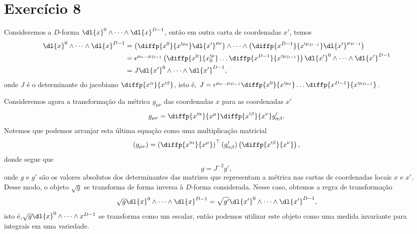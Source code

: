 \section*{Exercício 8}
Consideremos a \(D\)-forma \(\dl{x}^0 \wedge \dots \wedge \dl{x}^{D-1}\), então em outra carta de coordenadas \(x'\), temos
\begin{align*}
    \dl{x}^0 \wedge \dots \wedge \dl{x}^{D-1} &= \left(\diffp{x^0}{x'^{\mu_0}} \dl{x'}^{\mu_0}\right) \wedge \dots \wedge \left(\diffp{x^{D-1}}{x'^{\mu_{D-1}}}\dl{x'}^{\mu_{D-1}}\right)\\
                                              &= \epsilon^{\mu_0\dots\mu_{D-1}} \left(\diffp{x^0}{x'^\mu_0}\dots\diffp{x^{D-1}}{x'^{\mu_{D-1}}}\right) \dl{x'}^0\wedge\dots \wedge\dl{x'}^{D-1}\\
                                              &= J \dl{x'}^0\wedge\dots \wedge\dl{x'}^{D-1},
\end{align*}
onde \(J\) é o determinante do jacobiano \(\diffp{x^\alpha}{x'^\beta}\), isto é, \(J = \epsilon^{\mu_0\dots\mu_{D-1}}\diffp{x^0}{x'^{\mu_0}} \dots \diffp{x^{D-1}}{x'^{\mu_{D-1}}}\).

Consideremos agora a transformação da métrica \(g_{\mu\nu}\) das coordenadas \(x\) para as coordenadas \(x'\)
\begin{equation*}
    g_{\mu\nu} = \diffp{x'^\alpha}{x^\mu}\diffp{x'^\beta}{x^\nu}g'_{\alpha\beta}.
\end{equation*}
Notemos que podemos arranjar esta última equação como uma multiplicação matricial
\begin{equation*}
    (g_{\mu\nu}) = \left(\diffp{x'^\alpha}{x^\mu}\right)^\top(g'_{\alpha\beta})\left(\diffp{x'^\beta}{x^\nu}\right),
\end{equation*}
donde segue que
\begin{equation*}
    g = J^{-2} g',
\end{equation*}
onde \(g\) e \(g'\) são os valores absolutos dos determinantes das matrizes que representam a métrica nas cartas de coordenadas locais \(x\) e \(x'\). Desse modo, o objeto \(\sqrt{g}\) se transforma de forma inversa à \(D\)-forma considerada. Nesse caso, obtemos a regra de transformação
\begin{equation*}
    \sqrt{g} \dl{x}^0 \wedge \dots \wedge \dl{x}^{D-1} = \sqrt{g'} \dl{x'}^0 \wedge \dots \wedge \dl{x'}^{D-1},
\end{equation*}
isto é,\(\sqrt{g} \dl{x}^0 \wedge \dots \wedge{x}^{D-1}\) se transforma como um escalar, então podemos utilizar este objeto como uma medida invariante para integrais em uma variedade.

